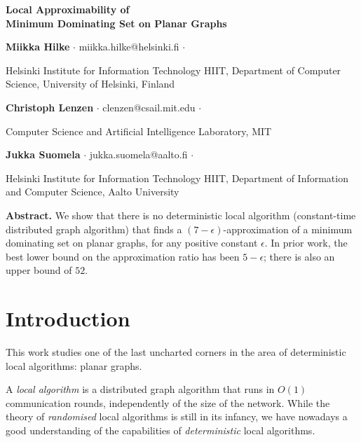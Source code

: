 \documentclass[11pt,a4paper]{article}
\theoremstyle{definition}
\begin{document}
\begin{flushleft}
{\Large\bfseries Local Approximability of \\ Minimum Dominating Set on Planar Graphs\par}
\bigskip
\bigskip

\textbf{Miikka Hilke}
$\cdot$
{\sffamily\small miikka.hilke@helsinki.fi}
$\cdot$
{\footnotesize
Helsinki Institute for Information Technology HIIT,
Department of Computer Science, University of Helsinki, Finland\par}

\medskip
\textbf{Christoph Lenzen}
$\cdot$
{\sffamily\small clenzen@csail.mit.edu}
$\cdot$
{\footnotesize
Computer Science and Artificial Intelligence Laboratory, MIT\par}

\medskip
\textbf{Jukka Suomela}
$\cdot$
{\sffamily\small jukka.suomela@aalto.fi}
$\cdot$
{\footnotesize
Helsinki Institute for Information Technology HIIT,
Department of Information and Computer Science, Aalto University\par}
\end{flushleft}

\bigskip
\noindent\textbf{Abstract.}
We show that there is no deterministic local algorithm (constant-time distributed graph algorithm) that finds a $(7-\epsilon)$-approximation of a minimum dominating set on planar graphs, for any positive constant $\epsilon$. In prior work, the best lower bound on the approximation ratio has been $5-\epsilon$; there is also an upper bound of $52$.

\medskip


\section{Introduction}

This work studies one of the last uncharted corners in the area of deterministic local algorithms: planar graphs.

A \emph{local algorithm} is a distributed graph algorithm that runs in $O(1)$ communication rounds, independently of the size of the network. While the theory of \emph{randomised} local algorithms is still in its infancy, we have nowadays a good understanding of the capabilities of \emph{deterministic} local algorithms.
\end{document}
